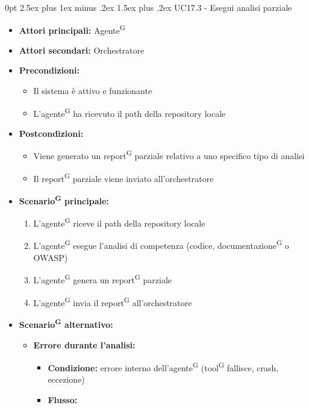 \documentclass[a4paper, 11pt]{article}
\makeatletter
\renewcommand\paragraph{\@startsection{paragraph}{4}
  {0pt}
  {2.5ex plus 1ex minus .2ex}
  {1.5ex plus .2ex}
  {\normalfont\normalsize\bfseries\color{AccentDark}}}
\makeatother
\begin{document}
\paragraph{UC17.3 - Esegui analisi parziale} \label{UC17.3}
\begin{itemize}
	\item \textbf{Attori principali:} Agente\textsuperscript{G}
	\item \textbf{Attori secondari:} Orchestratore 
	\item \textbf{Precondizioni:}
	\begin{itemize}
		\item Il sistema è attivo e funzionante
		\item L'agente\textsuperscript{G} ha ricevuto il path della repository locale
	\end{itemize}
	\item \textbf{Postcondizioni:} 
	\begin{itemize}
		\item Viene generato un report\textsuperscript{G} parziale relativo a uno specifico tipo di analisi
		\item Il report\textsuperscript{G} parziale viene inviato all'orchestratore
	\end{itemize}
	\item \textbf{Scenario\textsuperscript{G} principale:}
	\begin{enumerate}
		\item L'agente\textsuperscript{G} riceve il path della repository locale
		\item L'agente\textsuperscript{G} esegue l'analisi di competenza (codice, documentazione\textsuperscript{G} o OWASP)
		\item L'agente\textsuperscript{G} genera un report\textsuperscript{G} parziale
		\item L'agente\textsuperscript{G} invia il report\textsuperscript{G} all'orchestratore
	\end{enumerate}
	\item \textbf{Scenario\textsuperscript{G} alternativo:}
	\begin{itemize}
		\item \textbf{Errore durante l'analisi:} 
			\begin{itemize}
				\item \textbf{Condizione:} errore interno dell'agente\textsuperscript{G} (tool\textsuperscript{G} fallisce, crash, eccezione)
				\item \textbf{Flusso:} 
				\begin{enumerate}

\end{enumerate}
\end{itemize}
\end{itemize}
\end{itemize}
\end{document}

